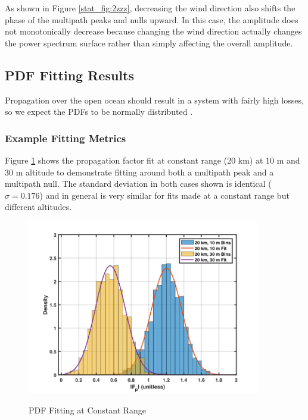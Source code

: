 As shown in Figure \ref{stat_fig:2zzz}, decreasing the wind direction also shifts the phase of the multipath peaks and nulls upward. In this case, the amplitude does not monotonically decrease because changing the wind direction actually changes the power spectrum surface \cite{frazier_ocean} rather than simply affecting the overall amplitude.

\subsection{PDF Fitting Results}
Propagation over the open ocean should result in a system with fairly high losses, so we expect the PDFs to be normally distributed \cite{yeh_first_principles} \cite{yeh_fading}. 

\subsubsection{Example Fitting Metrics}
Figure \ref{stat_fig:4} shows the propagation factor fit at constant range (20 km) at 10 m and 30 m altitude to demonstrate fitting around both a multipath peak and a multipath null. The standard deviation in both cases shown is identical ($\sigma = 0.176$) and in general is very similar for fits made at a constant range but different altitudes.

\begin{figure}[H]
  \begin{center}
\includegraphics[width=4in]{../media/statistics/constant_range_fit.png}
  \end{center}
  \renewcommand{\baselinestretch}{1} \small\normalsize
  \begin{quote}
    \caption[PDF Fitting at Constant Range]{PDF Fitting at Constant Range\label{stat_fig:4}}
  \end{quote}
\end{figure}
\renewcommand{\baselinestretch}{2} \small\normalsize

